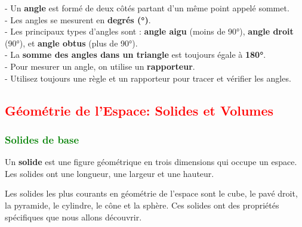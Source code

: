 \documentclass{article}
\begin{document}
\begin{tcolorbox}[colback=cyan!10!white, colframe=cyan!75!black, title=\textcolor{white}{Récapitulatif}, sharp corners=south]
    - Un \textbf{angle} est formé de deux côtés partant d'un même point appelé sommet. \\
    - Les angles se mesurent en \textbf{degrés (°)}. \\
    - Les principaux types d'angles sont : \textbf{angle aigu} (moins de 90°), \textbf{angle droit} (90°), et \textbf{angle obtus} (plus de 90°). \\
    - La \textbf{somme des angles dans un triangle} est toujours égale à \textbf{180°}. \\
    - Pour mesurer un angle, on utilise un \textbf{rapporteur}. \\
    - Utilisez toujours une règle et un rapporteur pour tracer et vérifier les angles.
\end{tcolorbox}

\subsection{\textcolor{red}{Géométrie de l'Espace: Solides et Volumes}}

\subsubsection{\textcolor{green}{Solides de base}}

\begin{tcolorbox}[colback=red!10!white, colframe=red!75!black, title=\textcolor{white}{Définition : Solide}, sharp corners=south]
    Un \textbf{solide} est une figure géométrique en trois dimensions qui occupe un espace. Les solides ont une longueur, une largeur et une hauteur.
\end{tcolorbox}

Les solides les plus courants en géométrie de l'espace sont le cube, le pavé droit, la pyramide, le cylindre, le cône et la sphère. Ces solides ont des propriétés spécifiques que nous allons découvrir.
\end{document}
